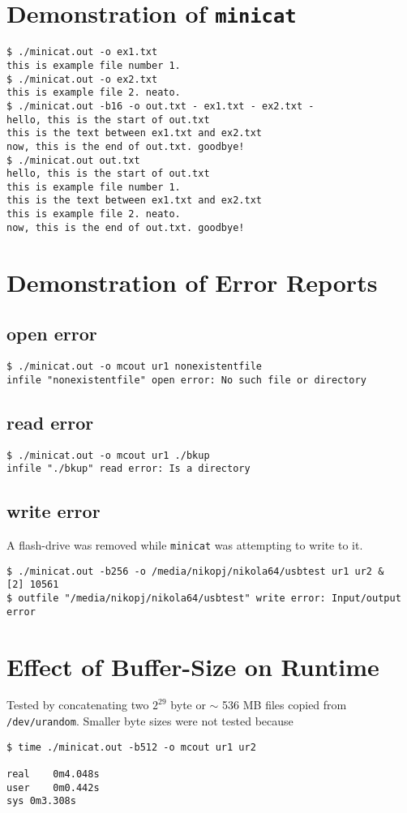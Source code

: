 \documentclass[10pt,a4paper]{article}
\begin{document}
\pagebreak

\section*{Demonstration of \texttt{minicat}}
\begin{verbatim}
$ ./minicat.out -o ex1.txt
this is example file number 1.
$ ./minicat.out -o ex2.txt
this is example file 2. neato.
$ ./minicat.out -b16 -o out.txt - ex1.txt - ex2.txt -
hello, this is the start of out.txt
this is the text between ex1.txt and ex2.txt
now, this is the end of out.txt. goodbye!
$ ./minicat.out out.txt
hello, this is the start of out.txt
this is example file number 1.
this is the text between ex1.txt and ex2.txt
this is example file 2. neato.
now, this is the end of out.txt. goodbye!
\end{verbatim}

\section*{Demonstration of Error Reports}
\subsection*{open error}
\begin{verbatim}
$ ./minicat.out -o mcout ur1 nonexistentfile
infile "nonexistentfile" open error: No such file or directory
\end{verbatim}

\subsection*{read error}
\begin{verbatim}
$ ./minicat.out -o mcout ur1 ./bkup
infile "./bkup" read error: Is a directory
\end{verbatim}

\subsection*{write error}
A flash-drive was removed while \verb|minicat| was attempting to write to it.
\begin{verbatim}
$ ./minicat.out -b256 -o /media/nikopj/nikola64/usbtest ur1 ur2 &
[2] 10561
$ outfile "/media/nikopj/nikola64/usbtest" write error: Input/output error
\end{verbatim}

\section*{Effect of Buffer-Size on Runtime}
Tested by concatenating two $2^{29}$ byte or $\sim$ 536 MB files copied from \verb|/dev/urandom|. Smaller byte sizes were not tested because 
\begin{verbatim}
$ time ./minicat.out -b512 -o mcout ur1 ur2

real	0m4.048s
user	0m0.442s
sys	0m3.308s
\end{verbatim}
\end{document}
